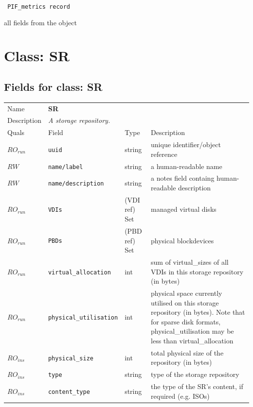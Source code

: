 \vspace{0.3cm}

{\tt 
PIF\_metrics record
}


all fields from the object
\vspace{0.3cm}
\vspace{0.3cm}
\vspace{0.3cm}

\vspace{1cm}
\newpage
\section{Class: SR}
\subsection{Fields for class: SR}
\begin{longtable}{|lllp{}|}
\hline
\multicolumn{1}{|l}{Name} & \multicolumn{3}{l|}{\bf SR} \\
\multicolumn{1}{|l}{Description} & \multicolumn{3}{l|}{\parbox{11cm}{\em A
storage repository.}} \\
\hline
Quals & Field & Type & Description \\
\hline
$\mathit{RO}_\mathit{run}$ &  {\tt uuid} & string & unique identifier/object reference \\
$\mathit{RW}$ &  {\tt name/label} & string & a human-readable name \\
$\mathit{RW}$ &  {\tt name/description} & string & a notes field containg human-readable description \\
$\mathit{RO}_\mathit{run}$ &  {\tt VDIs} & (VDI ref) Set & managed virtual disks \\
$\mathit{RO}_\mathit{run}$ &  {\tt PBDs} & (PBD ref) Set & physical blockdevices \\
$\mathit{RO}_\mathit{run}$ &  {\tt virtual\_allocation} & int & sum of virtual\_sizes of all VDIs in this storage repository (in bytes) \\
$\mathit{RO}_\mathit{run}$ &  {\tt physical\_utilisation} & int & physical space currently utilised on this storage repository (in bytes). Note that for sparse disk formats, physical\_utilisation may be less than virtual\_allocation \\
$\mathit{RO}_\mathit{ins}$ &  {\tt physical\_size} & int & total physical size of the repository (in bytes) \\
$\mathit{RO}_\mathit{ins}$ &  {\tt type} & string & type of the storage repository \\
$\mathit{RO}_\mathit{ins}$ &  {\tt content\_type} & string & the type of the SR's content, if required (e.g. ISOs) \\
\hline
\end{longtable}
